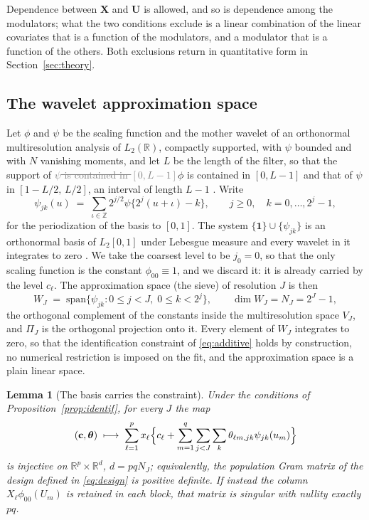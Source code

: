 \documentclass[12pt]{article} %
\newtheorem{lemma}{Lemma}
\theoremstyle{definition}
\theoremstyle{plain}
\newcommand{\R}{\mathbb{R}}
\newcommand{\cv}{\ell}
\newcommand{\md}{m}
\newcommand{\lev}{j}
\newcommand{\tsl}{k}
\newcommand{\jzero}{j_{0}}
\newcommand{\NJ}{N_{J}}
\newcommand{\bX}{\mathbf{X}}
\newcommand{\bU}{\mathbf{U}}
\newcommand{\lvl}[1]{c_{#1}}
\newcommand{\wav}[2]{\psi_{#1#2}}
\newcommand{\VJ}{V_{J}}
\newcommand{\WJ}{W_{J}}
\newcommand{\PiJ}{\Pi_{J}}
\newcommand{\coef}[4]{\theta_{#1#2,#3#4}}
\newcommand{\btheta}{\boldsymbol{\theta}}
\newcommand{\bc}{\mathbf{c}}
\begin{document}
Dependence between $\bX$ and $\bU$ is allowed, and so is dependence among the
modulators; what the two conditions exclude is a linear combination of the
linear covariates that is a function of the modulators, and a modulator that
is a function of the others. Both exclusions return in quantitative form in
Section~\ref{sec:theory}.

\subsection{The wavelet \texorpdfstring{\textcolor{colR1}{approximation space}}{approximation space}}
\label{sec:sieve}

Let $\phi$ and $\psi$ be the scaling function and the mother wavelet of an
orthonormal multiresolution analysis of $L_2(\R)$, compactly supported, with
$\psi$ bounded and with $N$ vanishing moments, and let $L$ be the length of
the filter, so that the support of \textcolor{gray}{\sout{$\psi$ is contained in $[0,L-1]$}}\textcolor{colR1}{$\phi$ is contained in $[0,L-1]$ and that of $\psi$ in $[1-L/2,\,L/2]$, an interval of length $L-1$} \citep[\textcolor{colR1}{Chapter~7}]{hardle1998wavelets}. Write
\begin{equation}
  \label{eq:periodized}
  \wav{\lev}{\tsl}(u) \;=\; \sum_{\iota \in \mathbb{Z}}
  2^{\lev/2}\psi\{2^{\lev}(u+\iota) - \tsl\},
  \qquad \lev \ge 0, \quad \tsl = 0,\dots,2^{\lev}-1,
\end{equation}
for the periodization of the basis to $[0,1]$. The system
$\{\mathbf{1}\}\cup\{\wav{\lev}{\tsl}\}$ is an orthonormal basis of
$L_2[0,1]$ under Lebesgue measure and every wavelet in it integrates to zero
\citep[Section 9.3]{Daubechies-1992}. We take the coarsest level to be
$\jzero = 0$, so that the only scaling function is the constant
$\phi_{00}\equiv 1$, and we discard it: it is already carried by the level
$\lvl{\cv}$. The \textcolor{colR1}{approximation space (the sieve)} of resolution $J$ is then
\[
  \WJ \;=\; \mathrm{span}\{\wav{\lev}{\tsl} : 0 \le \lev < J,\;
  0 \le \tsl < 2^{\lev}\},
  \qquad \dim \WJ = \NJ = 2^{J}-1,
\]
the orthogonal complement of the constants inside the multiresolution space
$\VJ$, and $\PiJ$ is the orthogonal projection onto it. Every element of $\WJ$
integrates to zero, so that the identification constraint of
\eqref{eq:additive} holds by construction, no numerical restriction is imposed
on the fit, and the \textcolor{colR1}{approximation space} is a plain linear space.

\begin{lemma}[The basis carries the constraint]
\label{lem:basis}
Under the conditions of Proposition~\ref{prop:identif}, for every $J$ the map
\[
  (\bc, \btheta) \;\longmapsto\;
  \sum_{\cv=1}^{p} x_{\cv}\Bigl\{\lvl{\cv} + \sum_{\md=1}^{q}
  \sum_{\lev<J}\sum_{\tsl} \coef{\cv}{\md}{\lev}{\tsl}
  \wav{\lev}{\tsl}(u_{\md})\Bigr\}
\]
is injective on $\R^{p}\times\R^{d}$, $d = pq\NJ$; equivalently, the
population Gram matrix of the design defined in \eqref{eq:design} is positive
definite. If instead the column $X_{\cv}\phi_{00}(U_{\md})$ is retained in
each block, that matrix is singular with nullity exactly $pq$.
\end{lemma}
\end{document}
